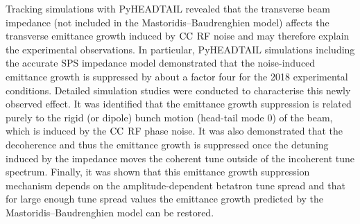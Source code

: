 Tracking simulations with PyHEADTAIL revealed that the transverse beam impedance (not included in the Mastoridis--Baudrenghien model) affects the transverse emittance growth induced by ${\mathrm{CC}}$ RF noise and may therefore explain the experimental observations. In particular, PyHEADTAIL simulations including the accurate SPS impedance model demonstrated that the noise-induced emittance growth is suppressed by about a factor four for the 2018 experimental conditions. Detailed simulation studies were conducted to characterise this newly observed effect. It was identified that the emittance growth suppression is related purely to the rigid (or dipole) bunch motion (head-tail mode 0) of the beam, which is induced by the ${\mathrm{CC}}$ RF phase noise. It was also demonstrated that the decoherence and thus the emittance growth is suppressed once the detuning induced by the impedance moves the coherent tune outside of the incoherent tune spectrum. Finally, it was shown that this emittance growth suppression mechanism depends on the amplitude-dependent betatron tune spread and that for large enough tune spread values the emittance growth predicted by the Mastoridis--Baudrenghien model can be restored.



